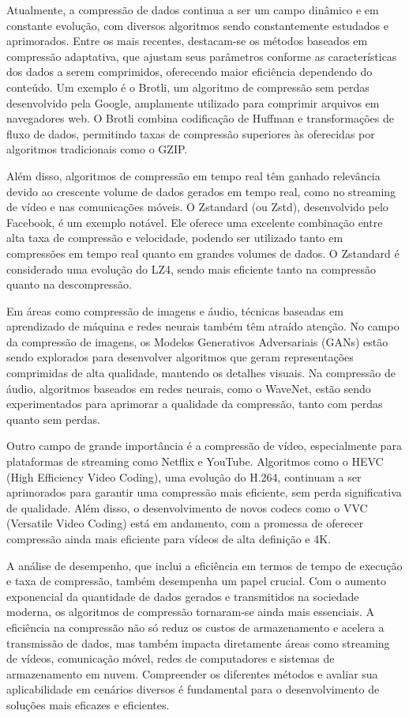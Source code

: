 Atualmente, a compressão de dados continua a ser um campo dinâmico e em constante evolução, com diversos algoritmos sendo constantemente estudados e aprimorados. Entre os mais recentes, destacam-se os métodos baseados em compressão adaptativa, que ajustam seus parâmetros conforme as características dos dados a serem comprimidos, oferecendo maior eficiência dependendo do conteúdo. Um exemplo é o Brotli, um algoritmo de compressão sem perdas desenvolvido pela Google, amplamente utilizado para comprimir arquivos em navegadores web. O Brotli combina codificação de Huffman e transformações de fluxo de dados, permitindo taxas de compressão superiores às oferecidas por algoritmos tradicionais como o GZIP.

Além disso, algoritmos de compressão em tempo real têm ganhado relevância devido ao crescente volume de dados gerados em tempo real, como no streaming de vídeo e nas comunicações móveis. O Zstandard (ou Zstd), desenvolvido pelo Facebook, é um exemplo notável. Ele oferece uma excelente combinação entre alta taxa de compressão e velocidade, podendo ser utilizado tanto em compressões em tempo real quanto em grandes volumes de dados. O Zstandard é considerado uma evolução do LZ4, sendo mais eficiente tanto na compressão quanto na descompressão.

Em áreas como compressão de imagens e áudio, técnicas baseadas em aprendizado de máquina e redes neurais também têm atraído atenção. No campo da compressão de imagens, os Modelos Generativos Adversariais (GANs) estão sendo explorados para desenvolver algoritmos que geram representações comprimidas de alta qualidade, mantendo os detalhes visuais. Na compressão de áudio, algoritmos baseados em redes neurais, como o WaveNet, estão sendo experimentados para aprimorar a qualidade da compressão, tanto com perdas quanto sem perdas.

Outro campo de grande importância é a compressão de vídeo, especialmente para plataformas de streaming como Netflix e YouTube. Algoritmos como o HEVC (High Efficiency Video Coding), uma evolução do H.264, continuam a ser aprimorados para garantir uma compressão mais eficiente, sem perda significativa de qualidade. Além disso, o desenvolvimento de novos codecs como o VVC (Versatile Video Coding) está em andamento, com a promessa de oferecer compressão ainda mais eficiente para vídeos de alta definição e 4K.

A análise de desempenho, que inclui a eficiência em termos de tempo de execução e taxa de compressão, também desempenha um papel crucial. Com o aumento exponencial da quantidade de dados gerados e transmitidos na sociedade moderna, os algoritmos de compressão tornaram-se ainda mais essenciais. A eficiência na compressão não só reduz os custos de armazenamento e acelera a transmissão de dados, mas também impacta diretamente áreas como streaming de vídeos, comunicação móvel, redes de computadores e sistemas de armazenamento em nuvem. Compreender os diferentes métodos e avaliar sua aplicabilidade em cenários diversos é fundamental para o desenvolvimento de soluções mais eficazes e eficientes.
